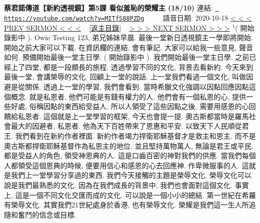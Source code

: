 \documentclass{book}
\begin{document}
\section{}
\label{sec:MITfS88PZDg}
\textbf{蔡君諾傳道【新約透視鏡】第5課  看似羞恥的榮耀主 (18/10)}
\newline
\newline
連結: \href{https://youtube.com/watch?v=MITfS88PZDg}{\texttt{ https://youtube.com/watch?v=MITfS88PZDg}} ~~~~ 語音日期: 2020-10-18 
\newline
\newline
\hyperref[sec:PD1mkT7LGh4]{\small{< < < PREV SERMON < < <}}
~
\hyperref[sec:index]{\small{[返主目錄]}}
~
\hyperref[sec:qH7MtIb583Y]{\small{> > > NEXT SERMON > > >}}
\newline
\newline
$^{1}$( 開始錄影中 ).
Owie Testing 123, 弟兄姊妹早晨.
最後一堂新日透視鏡主一學即將開始.
開始之前大家可以下載.
在資訊欄的連結, 會有筆記.
大家可以給我一些意見, 聲音如何.
預備開始最後一堂主日學.
( 開始錄影中 ).
我們開始最後一堂主日學.
之前已經上了四堂, 都是一段頗長的旅程.
透過學習不同的文化, 背景去看新約.
今天來到最後一堂, 會講榮辱的文化.
回顧上一堂的說話.
上一堂我們看過一個文化, 叫做因避是從關係.
透過上一堂的學習, 我們會看到.
當時希臘文化強調以因點回應因點這個概念.
就是私恩者, 他們可能是有錢有權力的人.
他們會有一個私恩的心, 提供一些好處, 俗稱因點的東西給受益人.
所以人領受了這些因點之後, 需要用感恩的心回饋給私恩者.
這個就是上一堂學習的框架, 今天也會提一提.
奧古斯都當時是羅馬社會最大的因避者, 私恩者.
他為天下百姓帶來了恩惠和平安.
以致天下人民順從君王.
我們看到在新約作者裡面.
新約作者竭力捍衛耶穌基督才是救主和恩主.
而不是奧古斯都捍衛耶穌基督作為私恩主的地位.
並且堅持萬物萬人, 無論是君王或平民.
都是受益人的角色, 領受神恩典的人.
這是口齒百密的神對我們的供應.
當我們每個人都領受這個恩典的時候, 便要用信心和感恩的心去回應神.
作卑微服事的人.
這就是我們上一堂學習分享過的東西.
我們今天接觸的主題是榮辱文化.
榮辱文化可以說是我們最熟悉的文化.
因為在我們成長的背景中, 我們也會面對這個文化.
事實上, 這是一個不同文化交匯而成的文化.
可以說是一個小小的總結.
第一世紀在希羅有榮辱文化.
其實我們21世紀處身於香港, 也有榮辱文化.
榮耀是我們這一生人所追隨和奮鬥的信念或目標.
\end{document}
